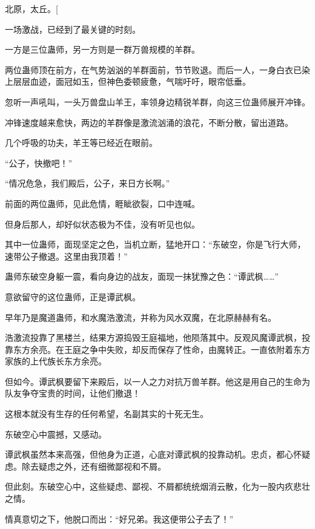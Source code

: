 
\begin{this_body}



北原，太丘。[

一场激战，已经到了最关键的时刻。

一方是三位蛊师，另一方则是一群万兽规模的羊群。

两位蛊师顶在前方，在气势汹汹的羊群面前，节节败退。而后一人，一身白衣已染上层层血迹，面冠如玉，但神色委顿疲惫，气喘吁吁，眼帘低垂。

忽听一声吼叫，一头万兽盘山羊王，率领身边精锐羊群，向这三位蛊师展开冲锋。

冲锋速度越来愈快，两边的羊群像是激流汹涌的浪花，不断分散，留出道路。

几个呼吸的功夫，羊王等已经近在眼前。

“公子，快撤吧！”

“情况危急，我们殿后，公子，来日方长啊。”

前面的两位蛊师，见此危情，睚眦欲裂，口中连喊。

但身后那人，却好似状态极为不佳，没有听见也似。

其中一位蛊师，面现坚定之色，当机立断，猛地开口：“东破空，你是飞行大师，速带公子撤退。这里由我顶着！”

蛊师东破空身躯一震，看向身边的战友，面现一抹犹豫之色：“谭武枫……”

意欲留守的这位蛊师，正是谭武枫。

早年乃是魔道蛊师，和水魔浩激流，并称为风水双魔，在北原赫赫有名。

浩激流投靠了黑楼兰，结果方源捣毁王庭福地，他陨落其中。反观风魔谭武枫，投靠东方余亮。在王庭之争中失败，却反而保存了性命，由魔转正。一直依附着东方家族的上代族长东方余亮。

但如今。谭武枫要留下来殿后，以一人之力对抗万兽羊群。他这是用自己的生命为队友争夺宝贵的时间，让他们撤退！

这根本就没有生存的任何希望，名副其实的十死无生。

东破空心中震撼，又感动。

谭武枫虽然本来高强，但他身为正道，心底对谭武枫的投靠动机。忠贞，都心怀疑虑。除去疑虑之外，还有细微鄙视和不屑。

但此刻。东破空心中，这些疑虑、鄙视、不屑都统统烟消云散，化为一股内疚悲壮之情。

情真意切之下，他脱口而出：“好兄弟。我这便带公子去了！”


\end{this_body}
